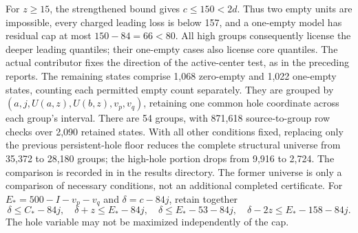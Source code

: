 \documentclass[11pt,a4paper]{article}
\begin{document}
For $z\ge15$, the strengthened bound gives $c\le150<2d$.
Thus two empty units are impossible, every charged leading loss is
below 157, and a one-empty model has residual cap at most
$150-84=66<80$. All high groups consequently license the deeper
leading quantiles; their one-empty cases also license core quantiles.
The actual contributor fixes the direction of the active-center test,
as in the preceding reports. The remaining states comprise 1,068
zero-empty and 1,022 one-empty states, counting each permitted empty
count separately. They are grouped by
$(a,j,U(a,z),U(b,z),v_p,v_q)$, retaining one common hole coordinate
across each group's interval. There are 54 groups, with
871,618 source-to-group row checks over 2,090 retained states.
With all other conditions fixed, replacing only the previous
persistent-hole floor reduces the complete structural universe from
35,372 to 28,180 groups; the high-hole portion drops from 9,916 to
2,724. The comparison is recorded in 
in the results directory. The former universe is only a comparison
of necessary conditions, not an additional completed certificate.
For $E_*=500-I-v_p-v_q$ and $\delta=c-84j$, retain together
\[
 \delta\le C_*-84j,\quad\delta+z\le E_*-84j,\quad
 \delta\le E_*-53-84j,\quad\delta-2z\le E_*-158-84j.
\]
The hole variable may not be maximized independently of the cap.
\end{document}
